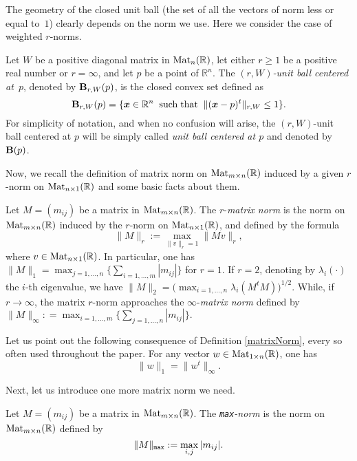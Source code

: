 \documentclass[10pt]{article}
\newcommand{\x}{{\bm x}}
\newcommand\R{{\mathbb R}}
\newtheorem{definition}[theorem]{Definition}
\newtheorem{re}[theorem]{Remark}
\newenvironment{rem*}{\begin{re}\em}{\end{re}}
\newenvironment{definition*}{\begin{definition}\em}{\end{definition}}
\begin{document}
The geometry of the closed unit ball (the set of all the vectors of norm 
less or equal to~$1$) clearly depends  on the norm we use. Here we consider the case of weighted $r$-norms.

\begin{definition*}\label{defCell}
Let $W$ be a positive diagonal matrix in ${\rm Mat}_n(\R)$, 
let either $r \ge 1$ be a positive real number or $r=\infty$, and 
let $p$ be a point of $\R^n$. 
The {\em $(r,W)$-unit ball centered at~$p$}, 
denoted by ${\bf B}_{r,W}(p)$, is the closed convex set defined as 
$$
{\bf B}_{r,W}(p) = \{\x \in \R^n \;\;{\rm such\; that}\;\; \|(\x-p)^t\|_{r, W} \le 1\}.
$$
For simplicity of notation, and when no confusion will arise,
the $(r,W)$-unit ball centered at $p$ will be simply called
{\em unit ball centered at $p$} and denoted by~${\bf B}(p)$.
\end{definition*}

Now, we  recall the definition of matrix norm   on $ {\rm Mat}_{m \times n}(\R)$ induced by
a given $r$-norm on $ {\rm Mat}_{n \times 1}(\R)$ and some basic facts about them.

\begin{definition*}\label{matrixNorm}
Let $M=(m_{ij})$ be a matrix in ${ \rm Mat}_{m \times n}(\R)$. 
The $r$-{\em matrix norm} is the norm on ${\rm Mat}_{m \times n}(\R) $   
induced by the $r$-norm on  ${\rm Mat}_{n \times 1}(\R)$,   and defined by the formula
$$\|M\|_r := \max_{\|v\|_r=1} \| Mv\|_r,$$  where $v\in  {\rm Mat}_{n \times 1}(\R)$.
In particular,  one has
$
\|M\|_1 = \max_{j=1,\ldots,n}\Big\{\sum_{i=1,\ldots,m} |m_{ij}| \Big\}
$ for $r=1$.
If $r=2$, denoting by $\lambda_i(\cdot)$  the $i$-th eigenvalue,   we have 
$
\|M\|_2 = \big(\max_{i=1,\ldots,n} \lambda_i(M^t M)\big)^{1/2}.
$
While,  if $r \rightarrow \infty$, the matrix $r$-norm approaches 
the $\infty$-{\em matrix  norm} defined by 
$
\|M\|_\infty: = \max_{i=1,\ldots,m}\Big\{\sum_{j=1,\ldots,n} |m_{ij}|\Big \}.
$
\end{definition*}

\begin{rem*}\label{65} Let us point out  the following consequence of Definition \ref{matrixNorm},  every so often  used throughout the paper.
 For any vector $w\in {\rm Mat}_{1\times n}(\R)$,  one has
 $$\| w\|_1= \| w^t\|_\infty.$$
\end{rem*}

Next, let us introduce one more matrix norm we need.

\begin{definition*}\label{defMaxNorm}
Let $M=(m_{ij})$ be a matrix in ${\rm Mat}_{m \times n}(\R)$. 
The {\em {\tt max}-norm} is the norm on ${\rm Mat}_{m \times n}(\R) $   
defined by 
$$
\|M\|_{\tt max} := \max_{i,j} |m_{ij}|.
$$  
\end{definition*}
\end{document}
